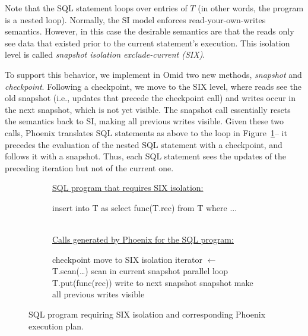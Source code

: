 Note that the SQL statement loops over entries of $T$ (in other words, the program is a nested loop). 
{{Normally, the SI model enforces read-your-own-writes semantics. However, in this case}}
the desirable semantics are that the reads only see  data that existed prior to the 
current statement's execution. This isolation level is called 
\emph{snapshot isolation exclude-current (SIX)}.

To support this behavior, we implement in Omid two new methods, {\em snapshot\/} and {\em checkpoint}.
Following a checkpoint, we move to the SIX level, where reads see the old snapshot (i.e., updates that
precede the checkpoint call) and writes occur in the next snapshot, which is not yet visible.
The snapshot call essentially resets the semantics back to SI, making all previous writes visible.
Given these two calls, Phoenix translates SQL statements as above to the loop in Figure~\ref{alg:six}-- 
it precedes the evaluation of the nested SQL statement with a checkpoint, and follows it with a snapshot.
Thus, each SQL statement sees the updates of the preceding iteration but not of the current one. 

\begin{figure}
\small
\begin{subfigure}[tb]{\columnwidth}
\underline{\hspace{\columnwidth}}
\underline{\small SQL program that requires SIX isolation:}
\begin{algorithmic}
\State insert into T as select func(T.rec) from T  where ... 
\EndFor
\end{algorithmic}
\end{subfigure}
\begin{subfigure}[tb]{\columnwidth}
\ \\
\underline{\small Calls generated by Phoenix for the SQL program:}
\begin{algorithmic}
\State checkpoint \Comment move to SIX isolation
\State iterator $\leftarrow$ T.scan(\dots) \Comment scan in current snapshot
 \Comment parallel loop
    \State T.put(func(rec)) \Comment write to next snapshot              
\EndFor
\State snapshot  \Comment make all previous writes visible
\EndFor
\end{algorithmic}
\underline{\hspace{\columnwidth}}
\end{subfigure}
\caption{\small   SQL program requiring SIX isolation and corresponding Phoenix execution plan.}
\vspace{-0.7cm}
\label{alg:six}
\end{figure}

